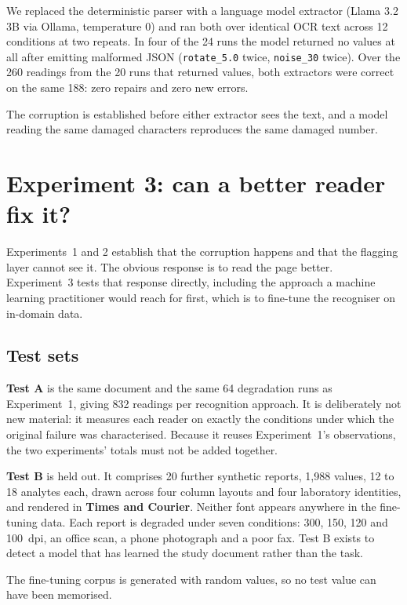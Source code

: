 \documentclass[11pt]{article}
\begin{document}
We replaced the deterministic parser with a language model extractor (Llama 3.2 3B via Ollama,
temperature 0) and ran both over identical OCR text across 12 conditions at two repeats. In
four of the 24 runs the model returned no values at all after emitting malformed JSON
(\texttt{rotate\_5.0} twice, \texttt{noise\_30} twice). Over the 260 readings from the 20 runs
that returned values, both extractors were correct on the same 188: zero repairs and zero new
errors.

The corruption is established before either extractor sees the text, and a model reading the
same damaged characters reproduces the same damaged number.

\section{Experiment 3: can a better reader fix it?}

Experiments~1 and 2 establish that the corruption happens and that the flagging layer cannot
see it. The obvious response is to read the page better. Experiment~3 tests that response
directly, including the approach a machine learning practitioner would reach for first, which is
to fine-tune the recogniser on in-domain data.

\subsection{Test sets}

\textbf{Test A} is the same document and the same 64 degradation runs as Experiment~1, giving
832 readings per recognition approach. It is deliberately not new material: it measures each
reader on exactly the conditions under which the original failure was characterised. Because it
reuses Experiment~1's observations, the two experiments' totals must not be added together.

\noindent \textbf{Test B} is held out. It comprises 20 further synthetic reports, 1{,}988 values, 12 to 18
analytes each, drawn across four column layouts and four laboratory identities, and rendered in
\textbf{Times and Courier}. Neither font appears anywhere in the fine-tuning data. Each report
is degraded under seven conditions: 300, 150, 120 and 100~dpi, an office scan, a phone
photograph and a poor fax. Test B exists to detect a model that has learned the study document
rather than the task.

The fine-tuning corpus is generated with random values, so no test value can have been
memorised.
\end{document}
